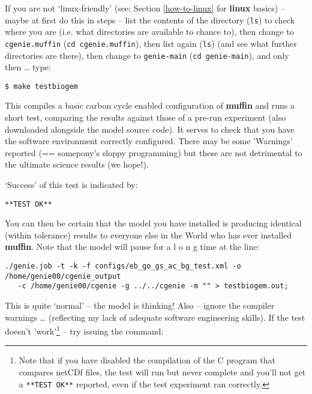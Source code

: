 \documentclass[11pt,fleqn]{book} %
\begin{document}
\noindent If you are not ‘linux-friendly’ (see: Section \ref{how-to-linux} for \textbf{linux} basics) – maybe at first do this in steps – list the contents of the directory (\texttt{ls}) to check where you are (i.e. what directories are available to chance to), then change to \texttt{cgenie.muffin} (\texttt{cd cgenie.muffin}), then list again (\texttt{ls}) (and see what further directories are there), then change to \texttt{genie-main} (\texttt{cd genie-main}), and only then … type:

\vspace{-2mm}
\begin{verbatim}
$ make testbiogem
\end{verbatim}
\vspace{-2mm}

\noindent This compiles a basic carbon cycle enabled configuration of \textbf{muffin} and runs a short test, comparing the results against those of a pre-run experiment (also downloaded alongside the model source code). It serves to check that you have the software environment correctly configured. There may be some ’Warnings’ reported (== somepony’s sloppy programming) but these are not detrimental to the ultimate science results (we hope!).

‘Success’ of this test is indicated by:

\vspace{-2mm}
\begin{verbatim}
**TEST OK**
\end{verbatim}
\vspace{-2mm}

\noindent You can then be certain that the model you have installed is producing identical (within tolerance) results to everyone else in the World who has ever installed \textbf{muffin}. Note that the model will pause for a l o n g time at the line:

\vspace{-2mm}
\small
\begin{verbatim}
./genie.job -t -k -f configs/eb_go_gs_ac_bg_test.xml -o /home/genie00/cgenie_output
   -c /home/genie00/cgenie -g ../../cgenie -m "" > testbiogem.out;
\end{verbatim}
\normalsize
\vspace{-2mm}

\noindent This is quite ‘normal’ – the model is thinking! Also -- ignore the compiler warnings … (reflecting my lack of adequate software engineering skills). If the test doesn't 'work'\footnote{Note that if you have disabled the compilation of the C program that compares netCDf files, the test will run but never complete and you'll not get a \texttt{**TEST OK**} reported, even if the test experiment ran correctly.} -- try issuing the command:
\end{document}
